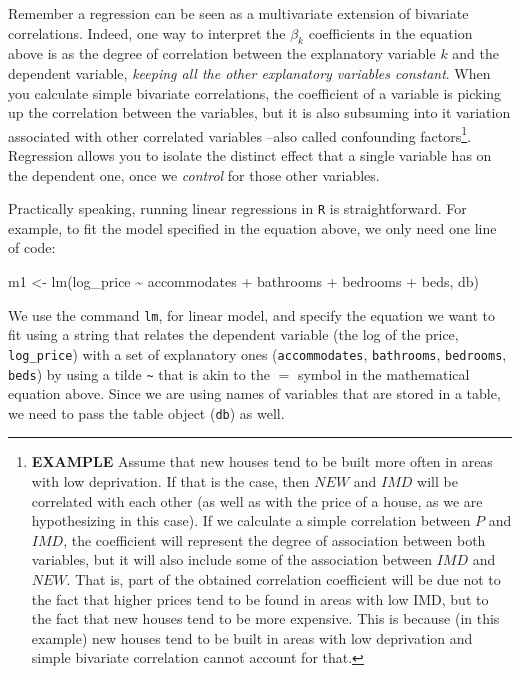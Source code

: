 \documentclass[
  letterpaper,
  krantz2]{style/krantz}
\newenvironment{Shaded}{\begin{snugshade}}{\end{snugshade}}
\newcommand{\FunctionTok}[1]{\textcolor[rgb]{0.28,0.35,0.67}{#1}}
\newcommand{\NormalTok}[1]{\textcolor[rgb]{0.00,0.23,0.31}{#1}}
\newcommand{\OtherTok}[1]{\textcolor[rgb]{0.00,0.23,0.31}{#1}}
\newcommand{\StringTok}[1]{\textcolor[rgb]{0.13,0.47,0.30}{#1}}
\begin{document}
Remember a regression can be seen as a multivariate extension of
bivariate correlations. Indeed, one way to interpret the \(\beta_k\)
coefficients in the equation above is as the degree of correlation
between the explanatory variable \(k\) and the dependent variable,
\emph{keeping all the other explanatory variables constant}. When you
calculate simple bivariate correlations, the coefficient of a variable
is picking up the correlation between the variables, but it is also
subsuming into it variation associated with other correlated variables
--also called confounding factors\footnote{\textbf{EXAMPLE} Assume that
  new houses tend to be built more often in areas with low deprivation.
  If that is the case, then \(NEW\) and \(IMD\) will be correlated with
  each other (as well as with the price of a house, as we are
  hypothesizing in this case). If we calculate a simple correlation
  between \(P\) and \(IMD\), the coefficient will represent the degree
  of association between both variables, but it will also include some
  of the association between \(IMD\) and \(NEW\). That is, part of the
  obtained correlation coefficient will be due not to the fact that
  higher prices tend to be found in areas with low IMD, but to the fact
  that new houses tend to be more expensive. This is because (in this
  example) new houses tend to be built in areas with low deprivation and
  simple bivariate correlation cannot account for that.}. Regression
allows you to isolate the distinct effect that a single variable has on
the dependent one, once we \emph{control} for those other variables.

Practically speaking, running linear regressions in \texttt{R} is
straightforward. For example, to fit the model specified in the equation
above, we only need one line of code:

\begin{Shaded}
\begin{Highlighting}[]
\NormalTok{m1 }\OtherTok{\textless{}{-}} \FunctionTok{lm}\NormalTok{(}\StringTok{\textquotesingle{}log\_price \textasciitilde{} accommodates + bathrooms + bedrooms + beds\textquotesingle{}}\NormalTok{, db)}
\end{Highlighting}
\end{Shaded}

We use the command \texttt{lm}, for linear model, and specify the
equation we want to fit using a string that relates the dependent
variable (the log of the price, \texttt{log\_price}) with a set of
explanatory ones (\texttt{accommodates}, \texttt{bathrooms},
\texttt{bedrooms}, \texttt{beds}) by using a tilde
\texttt{\textasciitilde{}} that is akin to the \(=\) symbol in the
mathematical equation above. Since we are using names of variables that
are stored in a table, we need to pass the table object (\texttt{db}) as
well.
\end{document}
